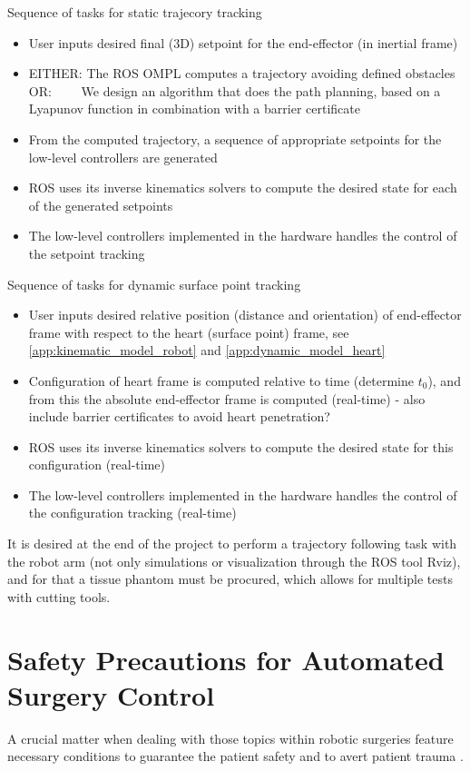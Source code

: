 Sequence of tasks for static trajecory tracking
\vspace{-3mm}
\begin{itemize}
	\itemsep-1.3mm
	\item User inputs desired final (3D) setpoint for the end-effector (in inertial frame)
	\item EITHER: The ROS OMPL computes a trajectory avoiding defined obstacles \\
	OR: $\qquad$We design an algorithm that does the path planning, based on a Lyapunov function in combination with a barrier certificate
	\item From the computed trajectory, a sequence of appropriate setpoints for the low-level controllers are generated
	\item ROS uses its inverse kinematics solvers to compute the desired state for each of the generated setpoints
	\item The low-level controllers implemented in the hardware handles the control of the setpoint tracking
\end{itemize}

Sequence of tasks for dynamic surface point tracking
\vspace{-3mm}
\begin{itemize}
	\itemsep-1.3mm
	\item User inputs desired relative position (distance and orientation) of end-effector frame with respect to the heart (surface point) frame, see \autoref{app:kinematic_model_robot} and \ref{app:dynamic_model_heart}
	\item Configuration of heart frame is computed relative to time (determine $t_0$), and from this the absolute end-effector frame is computed (real-time) - also include barrier certificates to avoid heart penetration?
	\item ROS uses its inverse kinematics solvers to compute the desired state for this configuration (real-time)
	\item The low-level controllers implemented in the hardware handles the control of the configuration tracking (real-time)
\end{itemize}

It is desired at the end of the project to perform a trajectory following task with the robot arm (not only simulations or visualization through the ROS tool Rviz), and for that a tissue phantom must be procured, which allows for multiple tests with cutting tools.

\section{Safety Precautions for Automated Surgery Control}
A crucial matter when dealing with those topics within robotic surgeries feature necessary conditions to guarantee the patient safety and to avert patient trauma \citep{bib:safety}.




